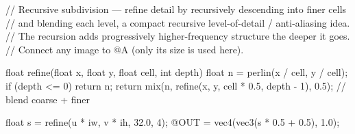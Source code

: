 // Recursive subdivision — refine detail by recursively descending into finer cells
// and blending each level, a compact recursive level-of-detail / anti-aliasing idea.
// The recursion adds progressively higher-frequency structure the deeper it goes.
// Connect any image to @A (only its size is used here).

float refine(float x, float y, float cell, int depth) {
    float n = perlin(x / cell, y / cell);
    if (depth <= 0) { return n; }
    return mix(n, refine(x, y, cell * 0.5, depth - 1), 0.5);   // blend coarse + finer
}

float s = refine(u * iw, v * ih, 32.0, 4);
@OUT = vec4(vec3(s * 0.5 + 0.5), 1.0);
